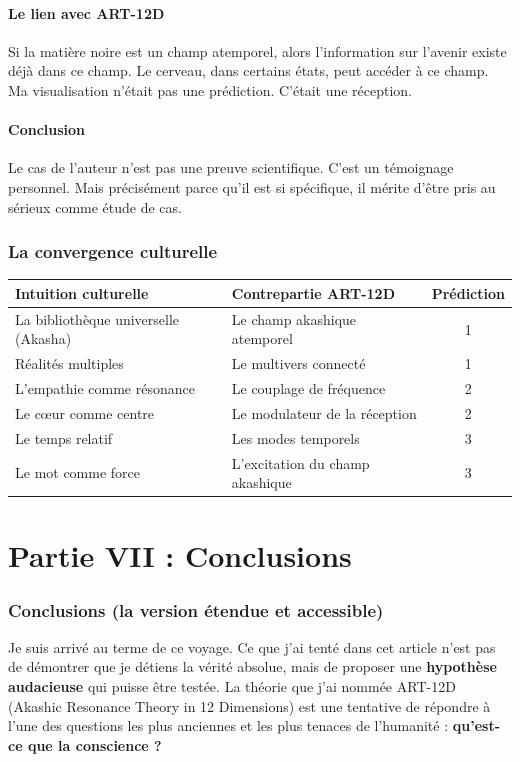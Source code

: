 \documentclass[11pt,a4paper]{article}
\begin{document}
\subsection{Le lien avec ART-12D}
Si la matière noire est un champ atemporel, alors l'information sur l'avenir existe déjà dans ce champ. Le cerveau, dans certains états, peut accéder à ce champ. Ma visualisation n'était pas une prédiction. C'était une réception.

\subsection{Conclusion}
Le cas de l'auteur n'est pas une preuve scientifique. C'est un témoignage personnel. Mais précisément parce qu'il est si spécifique, il mérite d'être pris au sérieux comme étude de cas.

\section{La convergence culturelle}
\begin{table}[H]
\centering
\begin{tabular}{@{}llc@{}}
\toprule
\textbf{Intuition culturelle} & \textbf{Contrepartie ART-12D} & \textbf{Prédiction} \\ \midrule
La bibliothèque universelle (Akasha) & Le champ akashique atemporel & 1 \\
Réalités multiples & Le multivers connecté & 1 \\
L'empathie comme résonance & Le couplage de fréquence & 2 \\
Le cœur comme centre & Le modulateur de la réception & 2 \\
Le temps relatif & Les modes temporels & 3 \\
Le mot comme force & L'excitation du champ akashique & 3 \\ \bottomrule
\end{tabular}
\end{table}

\newpage
\part*{Partie VII : Conclusions}

\section{Conclusions (la version étendue et accessible)}
Je suis arrivé au terme de ce voyage. Ce que j'ai tenté dans cet article n'est pas de démontrer que je détiens la vérité absolue, mais de proposer une \textbf{hypothèse audacieuse} qui puisse être testée. La théorie que j'ai nommée ART-12D (Akashic Resonance Theory in 12 Dimensions) est une tentative de répondre à l'une des questions les plus anciennes et les plus tenaces de l'humanité : \textbf{qu'est-ce que la conscience ?}
\end{document}
